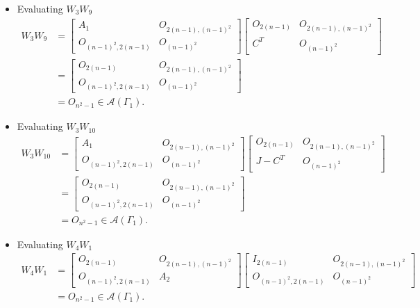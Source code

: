 \begin{itemize}
    \item Evaluating $W_3W_9$
    \begin{align*}
        W_3W_9
        &= \begin{bmatrix}
            A_1 & O_{2(n-1), (n-1)^2} \\
            O_{(n-1)^2, 2(n-1)} & O_{(n-1)^2}
        \end{bmatrix}\begin{bmatrix}
            O_{2(n-1)} & O_{2(n-1), (n-1)^2} \\
            C^T & O_{(n-1)^2}
        \end{bmatrix}\\
        &= \begin{bmatrix}
            O_{2(n-1)} & O_{2(n-1), (n-1)^2} \\
            O_{(n-1)^2, 2(n-1)} & O_{(n-1)^2}
        \end{bmatrix} \\
        &= O_{n^2-1}\in\mathcal{A}(\Gamma_1).
    \end{align*}
    
    \item Evaluating $W_3W_{10}$
    \begin{align*}
        W_3W_{10}
        &= \begin{bmatrix}
            A_1 & O_{2(n-1), (n-1)^2} \\
            O_{(n-1)^2, 2(n-1)} & O_{(n-1)^2}
        \end{bmatrix}\begin{bmatrix}
            O_{2(n-1)} & O_{2(n-1), (n-1)^2} \\
            J-C^T & O_{(n-1)^2}
        \end{bmatrix}\\
        &= \begin{bmatrix}
            O_{2(n-1)} & O_{2(n-1), (n-1)^2} \\
            O_{(n-1)^2, 2(n-1)} & O_{(n-1)^2}
        \end{bmatrix} \\
        &= O_{n^2-1}\in\mathcal{A}(\Gamma_1).
    \end{align*}
    
    \item Evaluating $W_4W_1$
    \begin{align*}
        W_4W_1
        &= \begin{bmatrix}
            O_{2(n-1)} & O_{2(n-1), (n-1)^2} \\
            O_{(n-1)^2, 2(n-1)} & A_2
        \end{bmatrix}\begin{bmatrix}
            I_{2(n-1)} & O_{2(n-1), (n-1)^2} \\
            O_{(n-1)^2, 2(n-1)} & O_{(n-1)^2}
        \end{bmatrix}\\
        &= O_{n^2-1}\in\mathcal{A}(\Gamma_1).
    \end{align*}
    

\end{itemize}
